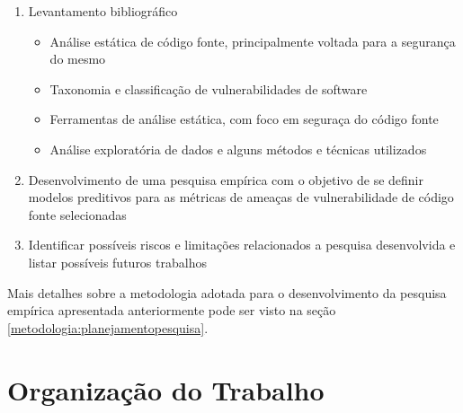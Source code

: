 \begin{enumerate}
  \item Levantamento bibliográfico
    \begin{itemize}
      \item Análise estática de código fonte, principalmente voltada para a
        segurança do mesmo
      \item Taxonomia e classificação de vulnerabilidades de software
      \item Ferramentas de análise estática, com foco em seguraça do código
        fonte
      \item Análise exploratória de dados e alguns métodos e técnicas utilizados
    \end{itemize}

  \item Desenvolvimento de uma pesquisa empírica com o objetivo de se definir
    modelos preditivos para as métricas de ameaças de vulnerabilidade de código
    fonte selecionadas

  \item Identificar possíveis riscos e limitações relacionados a pesquisa
    desenvolvida e listar possíveis futuros trabalhos
\end{enumerate}

Mais detalhes sobre a metodologia adotada para o desenvolvimento da pesquisa
empírica apresentada anteriormente pode ser visto na seção
\ref{metodologia:planejamentopesquisa}.

\section{Organização do Trabalho}

